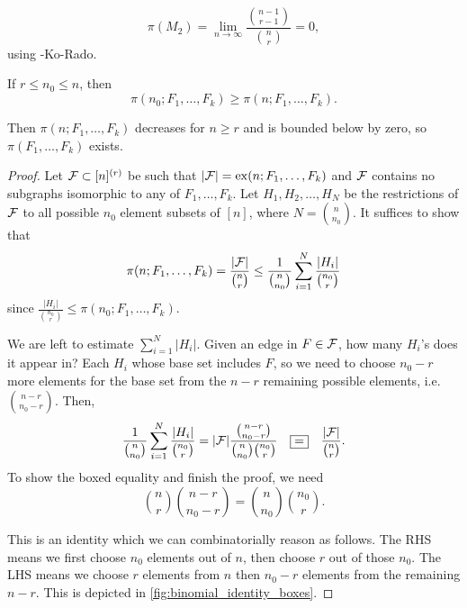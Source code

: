 \begin{example}
\[
\pi(M_2) = \lim_{n\to\infty} \frac{{n-1\choose r-1}}{{n\choose r}}=0,
\]
using \erdos-Ko-Rado. 
\end{example}
\begin{theorem}
If $r\leq n_0\leq n$, then
\[
\pi(n_0; F_1,\dotsc,F_k) \geq \pi(n; F_1,\dotsc,F_k).
\]\label{thm:pi_decreasing}
\end{theorem}
\begin{remark}
Then $\pi(n;F_1,\dotsc,F_k)$ decreases for $n\geq r$ and is bounded below by zero,  so $\pi(F_1,\dotsc,F_k)$ exists.
\end{remark}
\begin{proof}	
Let $\mathcal{F}\subset[n]^{(r)}$ be such that $|\mathcal{F}| = \operatorname{ex}(n; F_1,\dotsc,F_k)$ and $\mathcal{F}$ contains no subgraphs isomorphic to any of $F_1,\dotsc, F_k$. Let $H_1,H_2,\dotsc,H_N$ be the restrictions of $\mathcal{F}$ to all possible $n_0$ element subsets of $[n]$, where $N = {n\choose n_0}$.
 It suffices to show that
\[
\pi(n; F_1,\dotsc,F_k) = \frac{|\mathcal{F}|}{{n\choose r}} \leq \frac{1}{{n\choose n_0}} \sum_{i=1}^N \frac{|H_i|}{{n_0\choose r}}
\]
since $\frac{|H_i|}{{n_0\choose r}} \leq \pi(n_0; F_1,\dotsc,F_k)$. 

We are left to estimate $\sum_{i=1}^N|H_i|$.
Given an edge in $F\in\mathcal{F}$, how many $H_i$'s does it appear in? Each $H_i$ whose base set includes $F$, so we need to choose $n_0-r$ more elements for the base set from the $n-r$ remaining possible elements, i.e.  ${n-r \choose n_0-r}$.
Then,
\[
\frac{1}{{n\choose n_0}}\sum_{i=1}^N \frac{|H_i|}{{n_0\choose r}} = |\mathcal{F}| \frac{{n-r\choose n_0 -r}}{{n\choose n_0}{n_0\choose r}}\quad \boxed{=}\quad \frac{|\mathcal{F}|}{{n\choose r}}.
\]
To show the boxed equality and finish the proof, we need
\begin{equation}	\label{eq:binomial_identity_boxes}
{n\choose r}{n-r \choose n_0 -r} = {n\choose n_0}{n_0 \choose r}.
\end{equation}

This is an identity which we can combinatorially reason as follows. The RHS means we first choose $n_0$ elements out of $n$, then choose $r$ out of those $n_0$. The LHS means we choose $r$ elements from $n$ then $n_0-r$ elements from the remaining $n-r$. This is depicted in \cref{fig:binomial_identity_boxes}.


\end{proof}
